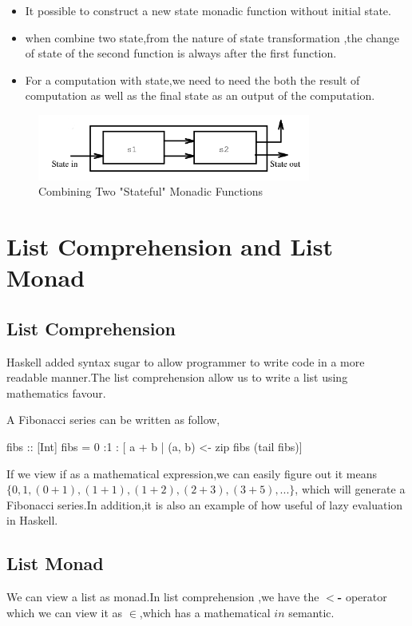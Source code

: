 \begin{itemize}
\item It possible to construct a new state monadic function without initial state.
\item when combine two state,from the nature of state transformation ,the change of state of  the second function is always after the first function.
\item For a computation with state,we need to need the both the result of computation as well as the final state as an output of the computation.
\end{itemize}

\begin{figure}[H]
  \centering
	\includegraphics[width=0.80\textwidth]{pic/c3/state_monad.png}
	\caption{Combining Two "Stateful" Monadic Functions}
\end{figure}


\section{List Comprehension and List Monad}
\subsection{List Comprehension}
Haskell added syntax sugar to allow programmer to write code in a more readable manner.The list comprehension allow us to write a list using mathematics favour.

A Fibonacci series can be written as follow,
\begin{hcode}
fibs :: [Int]
fibs = 0 :1 : [ a + b | (a, b) <- zip fibs (tail fibs)]
\end{hcode}

If we view if as a mathematical expression,we can easily figure out it means $ \lbrace  0,1 ,(0+1),(1+1),(1+2),(2+3),(3+5),... \rbrace $, which will generate a Fibonacci series.In addition,it is also an example of how useful of lazy evaluation in Haskell.

\subsection{List Monad}
We can view a list as monad.In list comprehension ,we have the \textbf{$<$-} operator which we can view it as $\in$,which has a mathematical $ in$  semantic.\\

